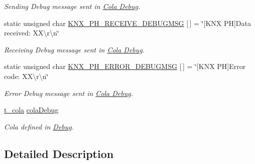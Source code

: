 \begin{DoxyCompactItemize}
\begin{DoxyCompactList}\small\item\em Sending Debug message sent in \hyperlink{group___cola___debug}{Cola Debug}. \end{DoxyCompactList}\item 
static unsigned char \hyperlink{group___k_n_x___p_h___sup___private___variables_ga29eb5f6a2e306cf5545c5a6af4623e35}{K\+N\+X\+\_\+\+P\+H\+\_\+\+R\+E\+C\+E\+I\+V\+E\+\_\+\+D\+E\+B\+U\+G\+M\+SG} \mbox{[}$\,$\mbox{]} = \char`\"{}\mbox{[}K\+NX PH\mbox{]}Data received\+: X\+X\textbackslash{}r\textbackslash{}n\char`\"{}\hypertarget{group___k_n_x___p_h___sup___private___variables_ga29eb5f6a2e306cf5545c5a6af4623e35}{}\label{group___k_n_x___p_h___sup___private___variables_ga29eb5f6a2e306cf5545c5a6af4623e35}

\begin{DoxyCompactList}\small\item\em Receiving Debug message sent in \hyperlink{group___cola___debug}{Cola Debug}. \end{DoxyCompactList}\item 
static unsigned char \hyperlink{group___k_n_x___p_h___sup___private___variables_ga598da98824813e3e2781a39bb3f90bfd}{K\+N\+X\+\_\+\+P\+H\+\_\+\+E\+R\+R\+O\+R\+\_\+\+D\+E\+B\+U\+G\+M\+SG} \mbox{[}$\,$\mbox{]} = \char`\"{}\mbox{[}K\+NX PH\mbox{]}Error code\+: X\+X\textbackslash{}r\textbackslash{}n\char`\"{}\hypertarget{group___k_n_x___p_h___sup___private___variables_ga598da98824813e3e2781a39bb3f90bfd}{}\label{group___k_n_x___p_h___sup___private___variables_ga598da98824813e3e2781a39bb3f90bfd}

\begin{DoxyCompactList}\small\item\em Error Debug message sent in \hyperlink{group___cola___debug}{Cola Debug}. \end{DoxyCompactList}\item 
\hyperlink{structt__cola}{t\+\_\+cola} \hyperlink{group___k_n_x___p_h___sup___private___variables_ga314fd637d927bd6a2551e119de623aa5}{cola\+Debug}\hypertarget{group___k_n_x___p_h___sup___private___variables_ga314fd637d927bd6a2551e119de623aa5}{}\label{group___k_n_x___p_h___sup___private___variables_ga314fd637d927bd6a2551e119de623aa5}

\begin{DoxyCompactList}\small\item\em Cola defined in \hyperlink{group___debug}{Debug}. \end{DoxyCompactList}\end{DoxyCompactItemize}


\subsection{Detailed Description}

